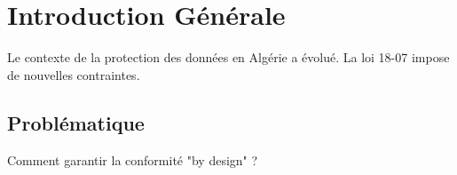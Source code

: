 \chapter{Introduction Générale}

Le contexte de la protection des données en Algérie a évolué.
La loi 18-07 impose de nouvelles contraintes.

\section{Problématique}
Comment garantir la conformité "by design" ?